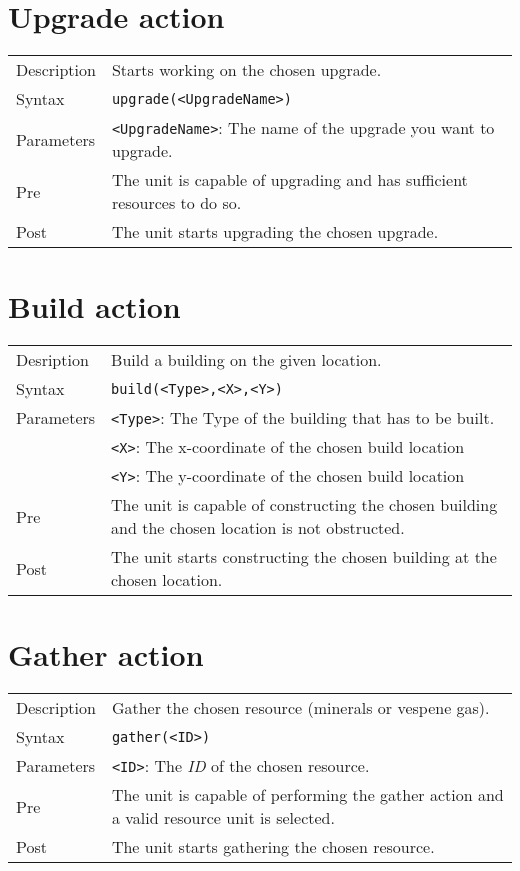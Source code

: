 \section{Upgrade action}
\begin{tabularx}{\textwidth}{lX}
 Description & Starts working on the chosen upgrade. \\
 Syntax & \verb|upgrade(<UpgradeName>)| \\
 Parameters & \verb|<UpgradeName>|: The name of the upgrade you want to upgrade.\\
 Pre & The unit is capable of upgrading and has sufficient resources to do so. \\
 Post & The unit starts upgrading the chosen upgrade.
\end{tabularx}

\section{Build action}
\begin{tabularx}{\textwidth}{lX}
 Desription & Build a building on the given location. \\
 Syntax & \verb|build(<Type>,<X>,<Y>)| \\
 Parameters & \verb|<Type>|: The Type of the building that has to be built.\\
            & \verb|<X>|: The x-coordinate of the chosen build location \\
            & \verb|<Y>|: The y-coordinate of the chosen build location \\
 Pre & The unit is capable of constructing the chosen building and the chosen location is not obstructed. \\
 Post & The unit starts constructing the chosen building at the chosen location.
\end{tabularx}

\section{Gather action}
\begin{tabularx}{\textwidth}{lX}
 Description & Gather the chosen resource (minerals or vespene gas). \\
 Syntax & \verb|gather(<ID>)| \\
 Parameters & \verb|<ID>|: The \textit{ID} of the chosen resource. \\
 Pre & The unit is capable of performing the gather action and a valid resource unit is selected. \\
 Post & The unit starts gathering the chosen resource.
\end{tabularx}

